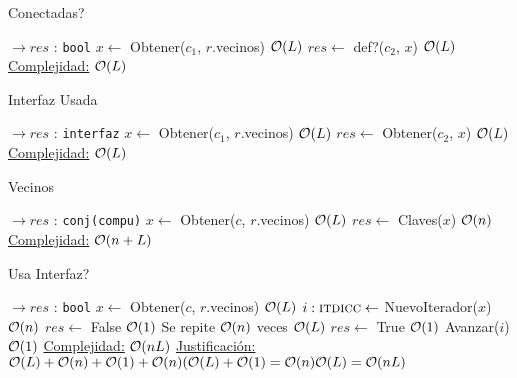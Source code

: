 \begin{Algoritmos}
\begin{algorithm}
\caption{Conectadas?}
\begin{algorithmic}[1]
    $\to res$ : \texttt{bool}
  \State $x \gets$ Obtener($c_1$, $r$.vecinos) \Comment $\mathcal{O}(L)$
  \State $res \gets$ def?($c_2$, $x$) \Comment $\mathcal{O}(L)$
 \EndProcedure
 \underline{Complejidad:} $\mathcal{O}(L)$
\end{algorithmic}
\end{algorithm}


\begin{algorithm}
\caption{Interfaz Usada}
\begin{algorithmic}[1]
   $\to res$ : \texttt{interfaz}
  \State $x \gets$ Obtener($c_1$, $r$.vecinos) \Comment $\mathcal{O}(L)$
  \State $res \gets$ Obtener($c_2$, $x$) \Comment $\mathcal{O}(L)$
 \EndProcedure
 \underline{Complejidad:} $\mathcal{O}(L)$
\end{algorithmic}
\end{algorithm}


\begin{algorithm}
\caption{Vecinos}
\begin{algorithmic}[1]
    $\to res$ : \texttt{conj(compu)}
  \State $x \gets$ Obtener($c$, $r$.vecinos) \Comment $\mathcal{O}(L)$
  \State $res \gets$ Claves($x$) \Comment $\mathcal{O}(n)$
 \EndProcedure
 \underline{Complejidad:} $\mathcal{O}(n+L)$
\end{algorithmic}
\end{algorithm}



\begin{algorithm}
\caption{Usa Interfaz?}
\begin{algorithmic}[1]
   $\to res$ : \texttt{bool} 
  \State $x \gets$ Obtener($c$, $r$.vecinos) \Comment $\mathcal{O}(L)$
  \State $i :\textsc{itdicc} \gets$ NuevoIterador($x$) \Comment $\mathcal{O}(n)$
  \State $res \gets$ False \Comment $\mathcal{O}(1)$
   \Comment Se repite $\mathcal{O}(n)$ veces
      \Comment $\mathcal{O}(L)$
       \State $res \gets$ True  \Comment $\mathcal{O}(1)$
    \EndIf
    \State Avanzar($i$) \Comment $\mathcal{O}(1)$
  \EndWhile
 \EndProcedure
 \underline{Complejidad:} $\mathcal{O}(nL)$
 \underline{Justificación:} $\mathcal{O}(L) + \mathcal{O}(n) + \mathcal{O}(1) + \mathcal{O}(n)(\mathcal{O}(L) + \mathcal{O}(1) = \mathcal{O}(n)\mathcal{O}(L) = \mathcal{O}(nL)$
\end{algorithmic}
\end{algorithm}



\end{Algoritmos}
